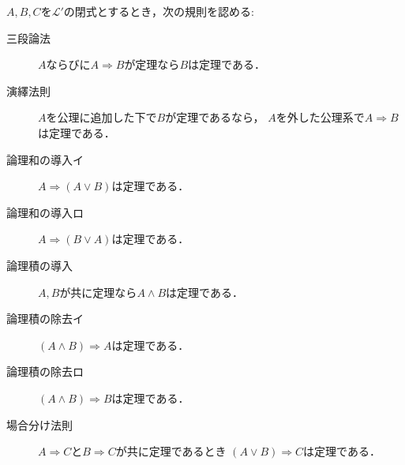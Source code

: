 	\begin{screen}
		\begin{logicalaxm}[基本的な推論規則]\label{logicalaxm:fundamental_rules_of_inference}
			$A,B,C$を$\mathcal{L}'$の閉式とするとき，次の規則を認める:
			\begin{description}
				\item[三段論法] $A$ならびに$A \Longrightarrow B$が定理なら$B$は定理である．
				\item[演繹法則] $A$を公理に追加した下で$B$が定理であるなら，
					$A$を外した公理系で$A \Longrightarrow B$は定理である．
				\item[論理和の導入イ] $A \Longrightarrow (A \vee B)$は定理である．
				\item[論理和の導入ロ] $A \Longrightarrow (B \vee A)$は定理である．
				\item[論理積の導入] $A,B$が共に定理なら$A \wedge B$は定理である．
				\item[論理積の除去イ] $(A \wedge B) \Longrightarrow A$は定理である．
				\item[論理積の除去ロ] $(A \wedge B) \Longrightarrow B$は定理である．
				\item[場合分け法則] $A \Longrightarrow C$と$B \Longrightarrow C$が共に定理であるとき
					$(A \vee B) \Longrightarrow C$は定理である．
			\end{description}	
		\end{logicalaxm}
	\end{screen}
	
	
